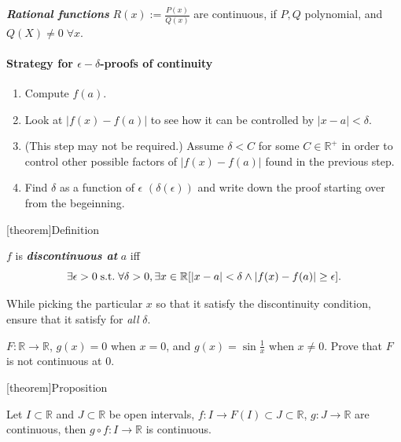 \documentclass[12pt]{report}
\theoremstyle{definition}
\begin{document}
\begin{ex}
    \textbf{\emph{Rational functions}} $R(x):=\frac{P(x)}{Q(x)}$ are continuous,
    if $P, Q$ polynomial, and $Q(X) \neq 0 \;\forall x$.
\end{ex}


\paragraph{Strategy for $\epsilon-\delta$-proofs of continuity}
\begin{enumerate}
    \item Compute $f(a)$.
    \item Look at $|f(x)-f(a)|$ to see how it can be controlled by $|x-a|<\delta$.
    \item (This step may not be required.) Assume $\delta<C$ for some $C\in\mathbb{R}^{+}$
        in order to control other possible factors of $|f(x) - f(a)|$ found in the previous step.
    \item Find $\delta$ as a function of $\epsilon$ $(\delta(\epsilon))$ and write down
        the proof starting over from the begeinning.
\end{enumerate}

[theorem]{Definition}
\begin{discontinuous at a}
    $f$ is \textbf{\emph{discontinuous at}} $a$ iff\[
        \exists \epsilon>0 \;\textnormal{s.t.}\; \forall\delta>0,
        \exists x\in\mathbb{R} [|x-a|<\delta \wedge|f(x)-f(a)|\ge\epsilon].
    \]
\end{discontinuous at a}

While picking the particular $x$ so that it satisfy the discontinuity condition,
ensure that it satisfy for \emph{all} $\delta$.
\begin{ex}
    $F:\mathbb{R}\rightarrow{}\mathbb{R}$,
    $g(x)=0$ when $x=0$, and $g(x) = \sin{\frac{1}{x}}$ when $x\neq 0$.
    Prove that $F$ is not continuous at 0.
\end{ex}

[theorem]{Proposition}
\begin{continiuos function composition is continuous}
    Let $I \subset \mathbb{R}$ and $J \subset \mathbb{R}$ be open intervals,
    $f:I\rightarrow{}F(I)\subset J \subset\mathbb{R}$, 
    $g:J\rightarrow{}\mathbb{R}$ are continuous,
    then $g\circ f:I\rightarrow{}\mathbb{R}$ is continuous.
\end{continiuos function composition is continuous}
\end{document}
